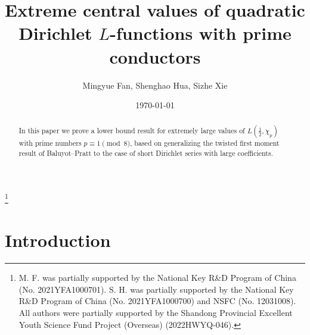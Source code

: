 \documentclass[12pt,reqno]{amsart}
\numberwithin{equation}{section}
\theoremstyle{plain}
\theoremstyle{definition}
\theoremstyle{remark}
\begin{document}
\title[Extreme central values]{Extreme central values of quadratic Dirichlet $L$-functions with prime conductors}


\author{Mingyue Fan, Shenghao Hua, Sizhe Xie}


\address{Data Science Institute and School of Mathematics \\ Shandong University \\ Jinan \\ Shandong 250100 \\China}



\date{\today}

\begin{abstract}
  In this paper we prove a lower bound result for extremely large values of $L(\frac{1}{2},\chi_p)$ with prime numbers $p\equiv 1\pmod 8$, based on generalizing the twisted first moment result of Baluyot--Pratt to the case of short Dirichlet series with large coefficients.
\end{abstract}


\thanks{M. F. was partially supported by the National Key R\&D Program of China (No. 2021YFA1000701).
S. H. was partially supported by the National Key R\&D Program of China (No. 2021YFA1000700) and NSFC
(No. 12031008).
All authors were partially supported by the Shandong Provincial Excellent Youth Science Fund Project (Overseas) (2022HWYQ-046).}


\maketitle


\section{Introduction} \label{sec:Intr}
\end{document}
